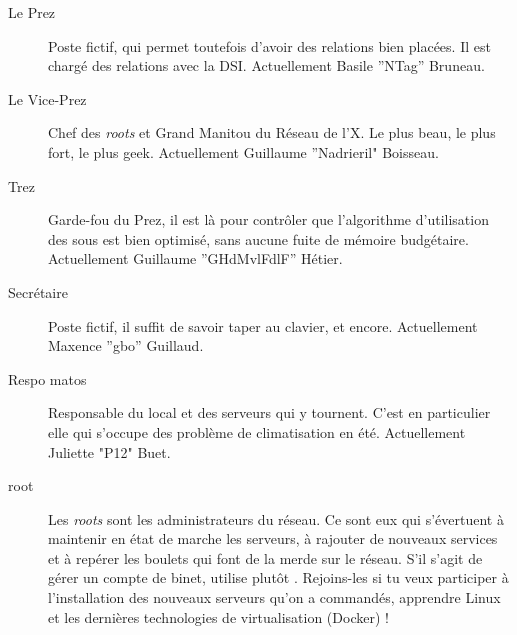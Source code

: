 \begin{description}

  \item[Le Prez]{Poste fictif, qui permet toutefois d'avoir des relations bien placées. Il est chargé des relations avec la DSI. Actuellement Basile ''NTag'' Bruneau.}
  
  \item[Le Vice-Prez]{Chef des \emph{roots} et Grand Manitou du Réseau de l'X. Le plus beau, le plus fort, le plus geek. Actuellement Guillaume ''Nadrieril" Boisseau.}

  \item[Trez]{Garde-fou du Prez, il est là pour contrôler que l'algorithme d'utilisation des sous est bien optimisé, sans aucune fuite de mémoire budgétaire. Actuellement Guillaume ''GHdMvlFdlF'' Hétier.}

  \item[Secrétaire]{Poste fictif, il suffit de savoir taper au clavier, et encore. Actuellement Maxence ''gbo'' Guillaud.}

 \item[Respo matos]{Responsable du local et des serveurs qui y tournent. C'est en particulier elle qui s'occupe des problème de climatisation en été. Actuellement Juliette "P12" Buet.}

  \item[root]{Les \emph{roots} sont les administrateurs du réseau. Ce sont eux qui s'évertuent à maintenir en état de marche les serveurs, à rajouter de 
  nouveaux services et à repérer les boulets qui font de la merde sur le réseau. S'il s'agit de gérer un compte de binet, utilise plutôt . Rejoins-les si tu veux participer à l'installation des nouveaux serveurs qu'on a commandés, apprendre Linux et les dernières technologies de virtualisation (Docker) !}

%  
%
  

\end{description}
